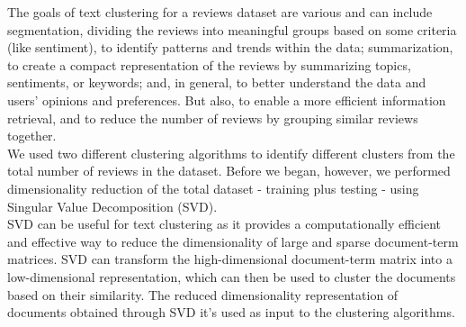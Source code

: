 \documentclass[fleqn,10pt]{SelfArx} %
\begin{document}
The goals of text clustering for a reviews dataset are various and can include segmentation, dividing the reviews into meaningful groups based on some criteria (like sentiment), to identify patterns and trends within the data; summarization, to create a compact representation of the reviews by summarizing topics, sentiments, or keywords; and, in general, to better understand the data and users' opinions and preferences. But also, to enable a more efficient information retrieval, and to reduce the number of reviews by grouping similar reviews together.\\
We used two different clustering algorithms to identify different clusters from the total number of reviews in the dataset. Before we began, however, we performed dimensionality reduction of the total dataset - training plus testing - using Singular Value Decomposition (SVD).\\
SVD can be useful for text clustering as it provides a computationally efficient and effective way to reduce the dimensionality of large and sparse document-term matrices. SVD can transform the high-dimensional document-term matrix into a low-dimensional representation, which can then be used to cluster the documents based on their similarity. The reduced dimensionality representation of documents obtained through SVD it's used as input to the clustering algorithms.
\end{document}
